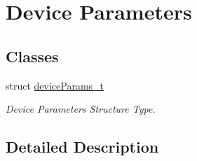 \hypertarget{group___device___parameters}{}\section{Device Parameters}
\label{group___device___parameters}
\subsection*{Classes}
\begin{DoxyCompactItemize}
\item 
struct \mbox{\hyperlink{structdevice_params__t}{device\+Params\+\_\+t}}
\begin{DoxyCompactList}\small\item\em Device Parameters Structure Type. \end{DoxyCompactList}\end{DoxyCompactItemize}


\subsection{Detailed Description}
